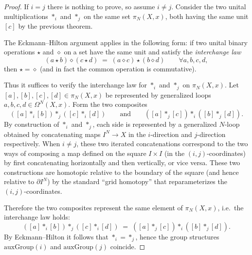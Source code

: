 \documentclass{article}
\begin{document}
\begin{proof}
If $i=j$ there is nothing to prove, so assume $i\neq j$.
Consider the two unital multiplications $\ast_i$ and $\ast_j$ on the same set $\pi_N(X,x)$, both
having the same unit $[c]$ by the previous theorem.

The Eckmann--Hilton argument applies in the following form: if two unital binary operations
$\star$ and $\diamond$ on a set have the same unit and satisfy the \emph{interchange law}
\[
(a\star b)\diamond(c\star d) \;=\; (a\diamond c)\star(b\diamond d)
\qquad \forall a,b,c,d,
\]
then $\star=\diamond$ (and in fact the common operation is commutative).

Thus it suffices to verify the interchange law for $\ast_i$ and $\ast_j$ on $\pi_N(X,x)$.
Let $[a],[b],[c],[d]\in \pi_N(X,x)$ be represented by generalized loops $a,b,c,d\in\Omega^{N}(X,x)$.
Form the two composites
\[
([a]\ast_i [b])\ast_j([c]\ast_i [d])
\qquad\text{and}\qquad
([a]\ast_j [c])\ast_i([b]\ast_j [d]).
\]
By construction of $\ast_i$ and $\ast_j$, each side is represented by a generalized $N$-loop obtained
by concatenating maps $I^{N}\to X$ in the $i$-direction and $j$-direction respectively.
When $i\neq j$, these two iterated concatenations correspond to the two ways of composing a map
defined on the square $I\times I$ (in the $(i,j)$-coordinates) by first concatenating horizontally
and then vertically, or vice versa. These two constructions are homotopic relative to the boundary
of the square (and hence relative to $\partial I^{N}$) by the standard ``grid homotopy'' that
reparameterizes the $(i,j)$-coordinates.

Therefore the two composites represent the same element of $\pi_N(X,x)$, i.e.\ the interchange law
holds:
\[
([a]\ast_i [b])\ast_j([c]\ast_i [d])
\;=\;
([a]\ast_j [c])\ast_i([b]\ast_j [d]).
\]
By Eckmann--Hilton it follows that $\ast_i=\ast_j$, hence the group structures
$\mathrm{auxGroup}(i)$ and $\mathrm{auxGroup}(j)$ coincide.
\end{proof}
\end{document}
